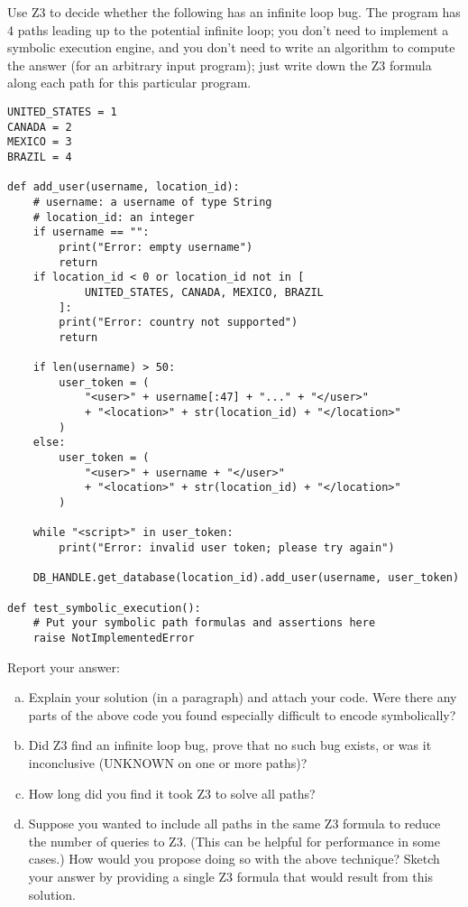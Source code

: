 \documentclass{article}
\begin{document}
\begin{enumerate}
Use Z3 to decide whether the following has an infinite loop bug.
The program has 4 paths leading up to the potential infinite loop; you don't need to implement a symbolic execution engine, and you don't need to write an algorithm to compute the answer (for an arbitrary input program); just write down the Z3 formula along each path for this particular program.

\begin{verbatim}
UNITED_STATES = 1
CANADA = 2
MEXICO = 3
BRAZIL = 4

def add_user(username, location_id):
    # username: a username of type String
    # location_id: an integer
    if username == "":
        print("Error: empty username")
        return
    if location_id < 0 or location_id not in [
            UNITED_STATES, CANADA, MEXICO, BRAZIL
        ]:
        print("Error: country not supported")
        return

    if len(username) > 50:
        user_token = (
            "<user>" + username[:47] + "..." + "</user>"
            + "<location>" + str(location_id) + "</location>"
        )
    else:
        user_token = (
            "<user>" + username + "</user>"
            + "<location>" + str(location_id) + "</location>"
        )

    while "<script>" in user_token:
        print("Error: invalid user token; please try again")

    DB_HANDLE.get_database(location_id).add_user(username, user_token)

def test_symbolic_execution():
    # Put your symbolic path formulas and assertions here
    raise NotImplementedError

\end{verbatim}

Report your answer:

\begin{enumerate}[(a)]
\item Explain your solution (in a paragraph) and attach your code. Were there any parts of the above code you found especially difficult to encode symbolically?
\item Did Z3 find an infinite loop bug, prove that no such bug exists, or was it inconclusive (UNKNOWN on one or more paths)?
\item How long did you find it took Z3 to solve all paths?
\item Suppose you wanted to include all paths in the same Z3 formula to reduce the number of queries to Z3.
(This can be helpful for performance in some cases.) How would you propose doing so with the above technique?
Sketch your answer by providing a single Z3 formula that would result from this solution.
\end{enumerate}

\end{enumerate}
\end{document}
